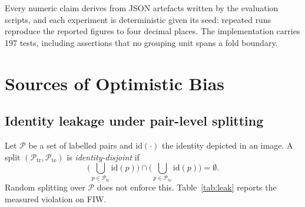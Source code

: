 \documentclass[preprint,12pt]{elsarticle}
\begin{document}
Every numeric claim derives from JSON artefacts written by the evaluation
scripts, and each experiment is deterministic given its seed: repeated runs
reproduce the reported figures to four decimal places. The implementation
carries 197 tests, including assertions that no grouping unit spans a fold
boundary.

\section{Sources of Optimistic Bias}
\label{sec:bias}

\subsection{Identity leakage under pair-level splitting}

Let $\mathcal{P}$ be a set of labelled pairs and $\mathrm{id}(\cdot)$ the
identity depicted in an image. A split $(\mathcal{P}_{\text{tr}},
\mathcal{P}_{\text{te}})$ is \emph{identity-disjoint} if
\begin{equation}
\Big(\bigcup_{p \in \mathcal{P}_{\text{tr}}} \mathrm{id}(p)\Big) \cap
\Big(\bigcup_{p \in \mathcal{P}_{\text{te}}} \mathrm{id}(p)\Big) = \emptyset .
\end{equation}
Random splitting over $\mathcal{P}$ does not enforce this. Table~\ref{tab:leak}
reports the measured violation on FIW.

\begin{table}[t]
\caption{Identity leakage under a random $80/20$ pair-level split of FIW.}
\label{tab:leak}
\centering
{}
\end{table}
\end{document}
